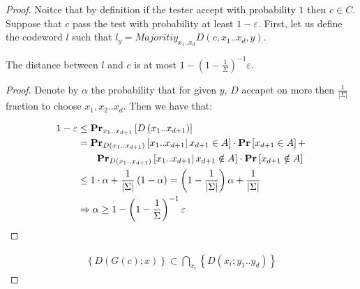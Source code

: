 \begin{proof}
  Noitce that by definition if the tester accept with probability $1$ then $c \in C$. Suppose that $c$ pass the test with probability at least $1 - \varepsilon$. First, let us define the codeword $l$ such that $ l_{y} = Majoritiy_{x_1 .. x_{d}}D\left(c, x_{1}.. x_{d},y\right)$.

  \begin{claim} 
    The distance between $l$ and $c$ is at most $ 1- \left( 1 - \frac{1}{\Sigma} \right)^{-1}\varepsilon$.  
  \end{claim}
  \begin{proof} 
    Denote by $\alpha$ the probability that for given $y$, $D$ accapet on more then $\frac{1}{|\Sigma|}$ fraction to choose $x_{1},x_{2}..x_{d}$. 
    Then we have that:  
    
    \begin{equation*}
      \begin{split}
        1 - \varepsilon  & \le \prbm{ D\left( x_1 .. x_{d+1} \right) }{x_1 .. x_{d+1}}  \\
        & = \prbcprb{  D\left( x_1 .. x_{d+1} \right)}{ x_1 .. x_{d+1}  }{ x_{d+1} \in A } + \\
        & \ \ \ \ \ \ \prbcprb{ D\left( x_1 .. x_{d+1} \right)}{ x_1 .. x_{d+1}   }{ x_{d+1} \notin A } \\
        & \le 1 \cdot \alpha +  \frac{1}{|\Sigma|}  \left( 1 - \alpha \right) = \left( 1 - \frac{1}{|\Sigma|} \right) \alpha  + \frac{1}{|\Sigma|} \\
       & \Rightarrow \alpha \ge  1- \left( 1 - \frac{1}{\Sigma} \right)^{-1}\varepsilon
      \end{split}
    \end{equation*}
  \end{proof} 

  \begin{equation*}
    \begin{split}
      \left\{ D(G(c) ; x ) \right\} \subset \bigcap_{ x_{i} } \left\{ D\left( x_{i} ; y_{1} .. y_{d} \right)  \right\} 
    \end{split}
  \end{equation*}
\end{proof}


